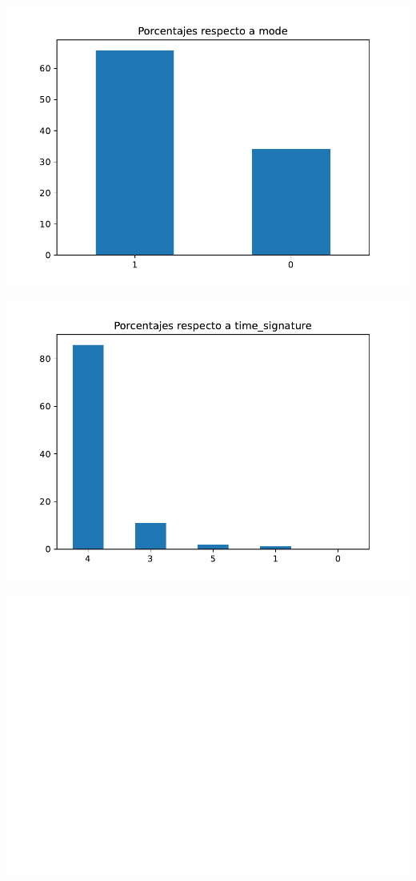 \documentclass[
  letterpaper,
  DIV=11,
  numbers=noendperiod]{scrartcl}
\begin{document}
\includegraphics{informe_01_files/figure-pdf/unnamed-chunk-30-23.pdf}

\includegraphics{informe_01_files/figure-pdf/unnamed-chunk-30-24.pdf}

\includegraphics{informe_01_files/figure-pdf/unnamed-chunk-30-25.pdf}
\end{document}
